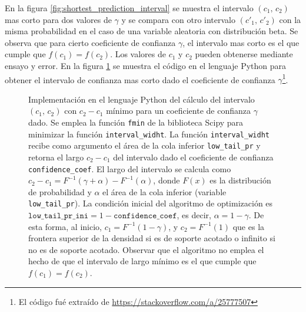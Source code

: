 \documentclass[a4paper]{report}
\begin{document}
En la figura \ref{fig:shortest_prediction_interval} se muestra el intervalo \((c_1,\,c_2)\) mas corto para dos valores de \(\gamma\) y se compara con otro intervalo \((c'_1,\,c'_2)\) con la misma probabilidad en el caso de una variable aleatoria con distribución beta. Se observa que para cierto coeficiente de confianza \(\gamma\), el intervalo mas corto es el que cumple que \(f(c_1)=f(c_2)\). Los valores de \(c_1\) y \(c_2\) pueden obtenerse mediante ensayo y error. En la figura \ref{fig:shortest_prediction_interval_code} se muestra el código en el lenguaje Python para obtener el intervalo de confianza mas corto dado el coeficiente de confianza \(\gamma\)\footnote{El código fué extraído de \url{https://stackoverflow.com/a/25777507}}.
\begin{figure}[!htb]
\begin{center}

\caption{\label{fig:shortest_prediction_interval_code} Implementación en el lenguaje Python del cálculo del intervalo \((c_1,\,c_2)\) con \(c_2-c_1\) mínimo para un coeficiente de confianza \(\gamma\) dado. Se emplea la función \texttt{fmin} de la biblioteca Scipy para minimizar la función \texttt{interval\_widht}. La función \texttt{interval\_widht} recibe como argumento el área de la cola inferior \texttt{low\_tail\_pr} y retorna el largo \(c_2-c_1\) del intervalo dado el coeficiente de confianza \texttt{confidence\_coef}. El largo del intervalo se calcula como \(c_2-c_1=F^{-1}(\gamma+\alpha)-F^{-1}(\alpha)\), donde \(F(x)\) es la distribución de probabilidad y \(\alpha\) el área de la cola inferior (variable \texttt{low\_tail\_pr}). La condición inicial del algoritmo de optimización es \(\texttt{low\_tail\_pr\_ini}=1-\texttt{confidence\_coef}\), es decir, \(\alpha=1-\gamma\). De esta forma, al inicio, \(c_1=F^{-1}(1-\gamma)\), y \(c_2=F^{-1}(1)\) que es la frontera superior de la densidad si es de soporte acotado o infinito si no es de soporte acotado. Observar que el algoritmo no emplea el hecho de que el intervalo de largo mínimo es el que cumple que \(f(c_1)=f(c_2)\).}
\end{center}
\end{figure}                                                                                                                                                                                                                                                                                                                                                                                                                                                                                                                                                                                                                                                                                                                                                                                                                                                                                                                                                                                                                                                                                                                                                                           
\end{document}

